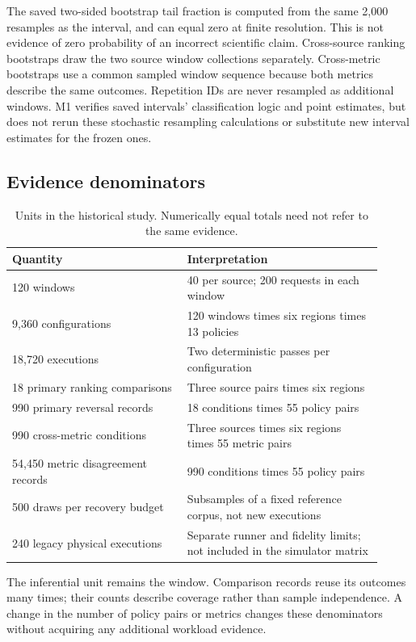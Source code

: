 The saved two-sided bootstrap tail fraction is computed from the same
2,000 resamples as the interval, and can equal zero at finite resolution.
This is not evidence of zero probability of an incorrect scientific claim.
Cross-source ranking bootstraps draw the two source window collections
separately. Cross-metric bootstraps use a common sampled window sequence
because both metrics describe the same outcomes. Repetition IDs are never
resampled as additional windows. M1 verifies saved intervals' classification
logic and point estimates, but does not rerun these stochastic resampling
calculations or substitute new interval estimates for the frozen ones.

\subsection{Evidence denominators}
\begin{table}[t]\centering
\caption{Units in the historical study. Numerically equal totals need not
refer to the same evidence.}\label{tab:denominators}
\begin{tabular}{p{0.43\linewidth}p{0.48\linewidth}}\toprule
Quantity & Interpretation\\\midrule
120 windows & 40 per source; 200 requests in each window\\
9,360 configurations & 120 windows times six regions times 13 policies\\
18,720 executions & Two deterministic passes per configuration\\
18 primary ranking comparisons & Three source pairs times six regions\\
990 primary reversal records & 18 conditions times 55 policy pairs\\
990 cross-metric conditions & Three sources times six regions times 55 metric pairs\\
54,450 metric disagreement records & 990 conditions times 55 policy pairs\\
500 draws per recovery budget & Subsamples of a fixed reference corpus, not new executions\\
240 legacy physical executions & Separate runner and fidelity limits; not included in the simulator matrix\\\bottomrule
\end{tabular}
\end{table}
The inferential unit remains the window. Comparison records reuse its
outcomes many times; their counts describe coverage rather than sample
independence. A change in the number of policy pairs or metrics changes
these denominators without acquiring any additional workload evidence.
